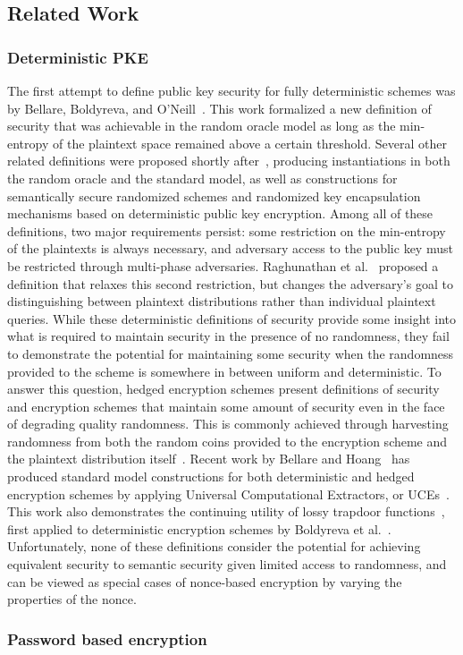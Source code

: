 \subsection{Related Work}
\label{rel_wk}

\subsubsection{Deterministic PKE}

The first attempt to define public key security for fully deterministic schemes was by Bellare, Boldyreva, and O'Neill~\cite{BBO07}.
This work formalized a new definition of security that was achievable in the random oracle model as long as the min-entropy
of the plaintext space remained above a certain threshold.  Several other related definitions were proposed shortly after~\cite{BFOR08,BSO08},
producing instantiations in both the random oracle and the standard model, as well as constructions for semantically secure randomized schemes
and randomized key encapsulation mechanisms based on deterministic public key encryption.
Among all of these definitions, two major requirements persist: some restriction on the min-entropy of the plaintexts is always necessary, and
adversary access to the public key must be restricted through multi-phase adversaries. Raghunathan et al.~\cite{RSV13} proposed
a definition that relaxes this second restriction, but changes the adversary's goal to distinguishing between plaintext distributions
rather than individual plaintext queries.  While these deterministic definitions of security provide some insight into what is
required to maintain security in the presence of no randomness, they fail to demonstrate the potential for maintaining some
security when the randomness provided to the scheme is somewhere in between uniform and deterministic.  To answer
this question, hedged encryption schemes present definitions of security and encryption schemes that maintain some
amount of security even in the face of degrading quality randomness.  This is commonly achieved through harvesting randomness
from both the random coins provided to the encryption scheme and the plaintext distribution itself~\cite{BBNRTSSHY2009}.  
Recent work by Bellare and Hoang~\cite{BH15}
has produced standard model constructions for both deterministic and hedged encryption schemes by applying Universal Computational Extractors,
or UCEs~\cite{BHK13}.  This work also demonstrates the continuing utility of lossy trapdoor functions~\cite{PW11}, first applied to deterministic encryption
schemes by Boldyreva et al.~\cite{BSO08}.  Unfortunately, none of these definitions consider the potential for achieving equivalent security to 
semantic security given limited access to randomness, and can be viewed as special cases of nonce-based encryption by varying the
properties of the nonce.

\subsubsection{Password based encryption}